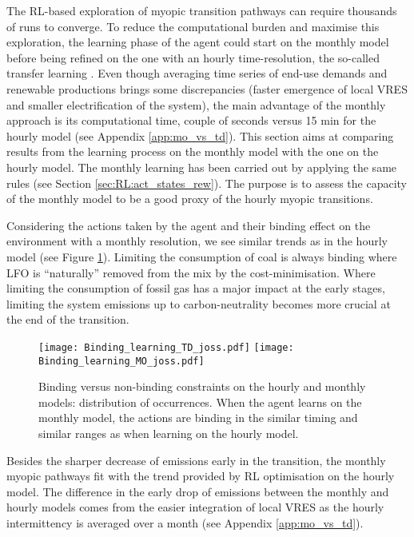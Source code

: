 The \acrfull{RL}-based exploration of myopic transition pathways can require thousands of runs to converge. To reduce the computational burden and maximise this exploration, the learning phase of the agent could start on the monthly model before being refined on the one with an hourly time-resolution, the so-called transfer learning \cite{mann2013directed}.  Even though averaging time series of end-use demands and renewable productions brings some discrepancies (\ie faster emergence of local VRES and smaller electrification of the system), the main advantage of the monthly approach is its computational time, \ie couple of seconds versus 15 min for the hourly model (see Appendix \ref{app:mo_vs_td}). This section aims at comparing results from the learning process on the monthly model with the one on the hourly model. The monthly learning has been carried out by applying the same rules (see Section \ref{sec:RL:act_states_rew}). The purpose is to assess the capacity of the monthly model to be a good proxy of the hourly myopic transitions.

Considering the actions taken by the agent and their binding effect on the environment with a monthly resolution,  we see similar trends as in the hourly model (see Figure \ref{fig:app:Binding_constr_joss}). Limiting the consumption of coal is always binding where \gls{LFO} is ``naturally'' removed from the mix by the cost-minimisation. Where limiting the consumption of fossil gas has a major impact at the early stages, limiting the system emissions up to carbon-neutrality becomes more crucial at the end of the transition.

\begin{figure}[!htbp]
\centering
\texttt{[image: Binding\_learning\_TD\_joss.pdf]}
\texttt{[image: Binding\_learning\_MO\_joss.pdf]}
\caption{Binding versus non-binding constraints on the hourly and monthly models: distribution of occurrences. When the agent learns on the monthly model, the actions are binding in the similar timing and similar ranges as when learning on the hourly model. }
\label{fig:app:Binding_constr_joss}
\end{figure} 

Besides the sharper decrease of emissions early in the transition, the monthly myopic pathways fit with the trend provided by \gls{RL} optimisation on the hourly model. The difference in the early drop of emissions between the monthly and hourly models comes from the easier integration of local \gls{VRES} as the hourly intermittency is averaged over a month (see Appendix \ref{app:mo_vs_td}). 

